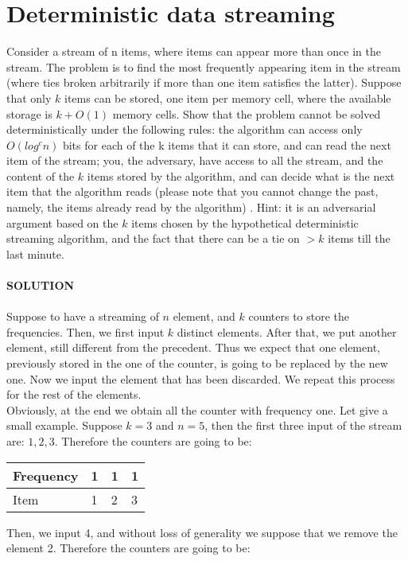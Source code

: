 \documentclass[a4paper]{article}
\begin{document}
\section*{Deterministic data streaming}
Consider a stream of n items, where items can appear more than once in the stream. The problem is to find the most frequently appearing item in the stream (where ties broken arbitrarily if more than one item satisfies the latter). Suppose that only $k$ items can be stored, one item per memory cell, where the available storage is $k + O(1)$ memory cells. Show that the problem cannot be solved deterministically under the following rules: the algorithm can access only $O(log^c n)$ bits for each of the k items that it can store, and can read the next item of the stream; you, the adversary, have access to all the stream, and the content of the $k$ items stored by the algorithm, and can decide what is the next item that the algorithm reads (please note that you cannot change the past, namely, the items already read by the algorithm) . Hint: it is an adversarial argument based on the $k$ items chosen by the hypothetical deterministic streaming algorithm, and the fact that there can be a tie on $> k$ items till the last minute.
\\
\\
\textbf{SOLUTION}
\\
\\
Suppose to have a streaming of $n$ element, and $k$ counters to store the frequencies. Then, we first input $k$ distinct elements. After that, we put another element, still different from the precedent. Thus we expect that one element, previously stored in the one of the counter, is going to be replaced by the new one. Now we input the element that has been discarded. We repeat this process for the rest of the elements. 
\\
Obviously, at the end we obtain all the counter with frequency one. Let give a small example. Suppose $k=3$ and $n=5$, then the first three input of the stream are: $1,2,3$. Therefore the counters are going to be:
\begin{table}[H]
\centering
\begin{tabular}{|l|l|l|l|}
\hline
Frequency & 1 & 1 & 1 \\ \hline
Item      & 1 & 2 & 3 \\ \hline
\end{tabular}
\end{table}
Then, we input 4, and without loss of generality we suppose that we remove the element 2.  Therefore the counters are going to be:
\end{document}
